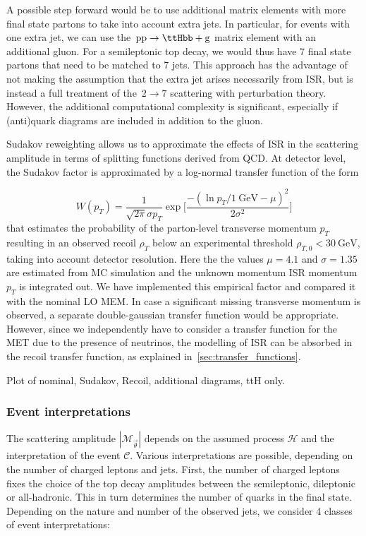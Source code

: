 A possible step forward would be to use additional matrix elements with more final state partons to take into account extra jets. In particular, for events with one extra jet, we can use the~$\mathrm{pp} \rightarrow \ttHbb + \mathrm{g}$ matrix element with an additional gluon. For a semileptonic top decay, we would thus have 7 final state partons that need to be matched to 7 jets. This approach has the advantage of not making the assumption that the extra jet arises necessarily from ISR, but is instead a full treatment of the~$2 \rightarrow 7$ scattering with perturbation theory. However, the additional computational complexity is significant, especially if (anti)quark diagrams are included in addition to the gluon.

Sudakov reweighting allows us to approximate the effects of ISR in the scattering amplitude in terms of splitting functions derived from QCD. At detector level, the Sudakov factor is approximated by a log-normal transfer function of the form

\begin{equation}
W(p_T) = \frac{1}{\sqrt{2\pi} \sigma p_T} \exp \biggl[ \frac{-(\ln{p_T/1~\mathrm{GeV}} - \mu)^2}{2\sigma^2}\biggr]
\end{equation}
that estimates the probability of the parton-level transverse momentum $p_T$ resulting in an observed recoil $\rho_T$ below an experimental threshold $\rho_{T,0} < 30~\mathrm{GeV}$, taking into account detector resolution. Here the the values $\mu = 4.1$ and $\sigma = 1.35$ are estimated from MC simulation and the unknown momentum ISR momentum $p_T$ is integrated out. We have implemented this empirical factor and compared it with the nominal LO MEM. In case a significant missing transverse momentum is observed, a separate double-gaussian transfer function would be appropriate. However, since we independently have to consider a transfer function for the MET due to the presence of neutrinos, the modelling of ISR can be absorbed in the recoil transfer function, as explained in~\cref{sec:transfer_functions}.

\fix Plot of nominal, Sudakov, Recoil, additional diagrams, ttH only.

\subsubsection{Event interpretations}
\label{sec:event_interpretation}

The scattering amplitude $|\mathcal{M}_{\vec{\theta}}|$ depends on the assumed process $\mathcal{H}$ and the interpretation of the event $\mathcal{C}$. Various interpretations are possible, depending on the number of charged leptons and jets. First, the number of charged leptons fixes the choice of the top decay amplitudes between the semileptonic, dileptonic or all-hadronic. This in turn determines the number of quarks in the final state. Depending on the nature and number of the observed jets, we consider 4 classes of event interpretations:


